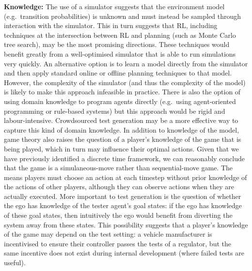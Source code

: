 \documentclass[10pt]{article}
\theoremstyle{plain}
\newenvironment{note}[1][]{\par\smallskip\noindent\textbf{#1}\rmfamily}{\smallskip}
\begin{document}
\begin{note}[Knowledge:]
    The use of a simulator suggests that the environment model (e.g.\ transition probabilities) is unknown and must instead be sampled through interaction with the simulator.
    This in turn suggests that RL, including techniques at the intersection between RL and planning (such as Monte Carlo tree search), may be the most promising directions.
    These techniques would benefit greatly from a well-optimised simulator that is able to run simulations very quickly.
    An alternative option is to learn a model directly from the simulator and then apply standard online or offline planning techniques to that model.
    However, the complexity of the simulator (and thus the complexity of the model) is likely to make this approach infeasible in practice.
    There is also the option of using domain knowledge to program agents directly (e.g.\ using agent-oriented programming or rule-based systems) but this approach would be rigid and labour-intensive.
    Crowdsourced test generation may be a more effective way to capture this kind of domain knowledge.
    In addition to knowledge of the model, game theory also raises the question of a player's knowledge of the game that is being played, which in turn may influence their optimal actions.
    Given that we have previously identified a discrete time framework, we can reasonably conclude that the game is a simulaneous-move rather than sequential-move game.
    The means players must choose an action at each timestep without prior knowledge of the actions of other players, although they can observe actions when they are actually executed.
    More important to test generation is the question of whether the ego has knowledge of the tester agent's goal states: if the ego has knowledge of these goal states, then intuitively the ego would benefit from diverting the system away from these states.
    This possibility suggests that a player's knowledge of the game may depend on the test setting: a vehicle manufacturer is incentivised to ensure their controller passes the tests of a regulator, but the same incentive does not exist during internal development (where failed tests are useful).
\end{note}
\end{document}

